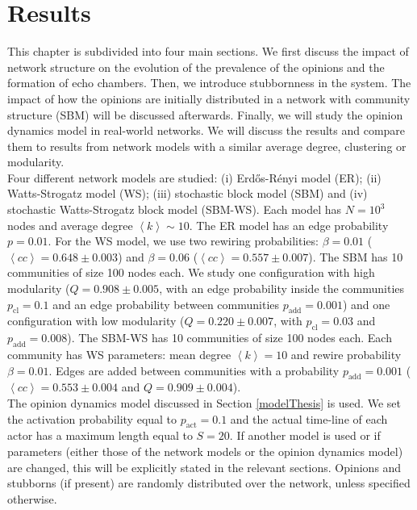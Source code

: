\documentclass[11 pt , letterpaper , twoside , openright]{book}
\begin{document}
\chapter{Results}

This chapter is subdivided into four main sections. We first discuss the impact of network structure on the evolution of the prevalence of the opinions and the formation of echo chambers. Then, we introduce stubbornness in the system. The impact of how the opinions are initially distributed in a network with community structure (SBM) will be discussed afterwards. Finally, we will study the opinion dynamics model in real-world networks. We will discuss the results and compare them to results from network models with a similar average degree, clustering or modularity.\\
\newline
Four different network models are studied: (i) Erd\H{o}s-R\'{e}nyi model (ER); (ii) Watts-Strogatz model (WS); (iii) stochastic block model (SBM) and (iv) stochastic Watts-Strogatz block model (SBM-WS). Each model has $N = 10^3$ nodes and average degree $\left<k\right> \sim 10$. The ER model has an edge probability $p = 0.01$. For the WS model, we use two rewiring probabilities: $\beta = 0.01$ ($\left<cc\right> = 0.648 \pm 0.003$) and $\beta = 0.06$ ($\left<cc\right> = 0.557 \pm 0.007$). The SBM has 10 communities of size 100 nodes each. We study one configuration with high modularity ($Q = 0.908 \pm 0.005$, with an edge probability inside the communities $p_{\text{cl}} = 0.1$ and an edge probability between communities $p_{\text{add}} = 0.001$) and one configuration with low modularity ($Q = 0.220 \pm 0.007$, with $p_{\text{cl}} = 0.03$ and $p_{\text{add}} = 0.008$). The SBM-WS has 10 communities of size 100 nodes each. Each community has WS parameters: mean degree $\left<k\right> =10$ and rewire probability $\beta = 0.01$. Edges are added between communities with a probability $p_{\text{add}} = 0.001$ ($\left<cc\right> = 0.553 \pm 0.004$ and $Q = 0.909 \pm 0.004$).\\
\newline
The opinion dynamics model discussed in Section \ref{modelThesis} is used. We set the activation probability equal to $p_{\text{act}} = 0.1$ and the actual time-line of each actor has a maximum length equal to $S=20$. If another model is used or if parameters (either those of the network models or the opinion dynamics model) are changed, this will be explicitly stated in the relevant sections. Opinions and stubborns (if present) are randomly distributed over the network, unless specified otherwise.
\end{document}
